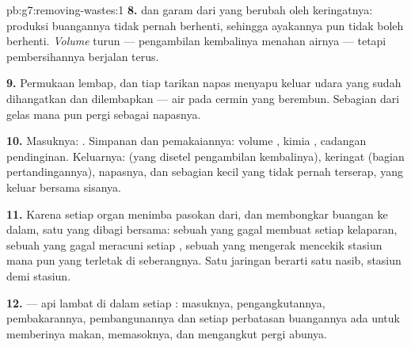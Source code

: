 \begin{solution}{pb:g7:removing-wastes:1}
\textbf{8.}  dan garam dari  yang berubah oleh keringatnya:
produksi buangannya tidak pernah berhenti, sehingga ayakannya pun
tidak boleh berhenti. \emph{Volume}  turun --- pengambilan
kembalinya menahan airnya --- tetapi pembersihannya berjalan terus.

\textbf{9.} Permukaan  lembap, dan tiap tarikan napas
menyapu keluar udara yang sudah dihangatkan dan dilembapkan --- air
pada cermin yang berembun. Sebagian dari gelas mana pun pergi sebagai
 napasnya.

\textbf{10.} Masuknya: . Simpanan dan pemakaiannya: volume
, kimia , cadangan pendinginan. Keluarnya:  (yang disetel
pengambilan kembalinya), keringat (bagian pertandingannya), 
napasnya, dan sebagian kecil yang tidak pernah terserap, yang keluar
bersama sisanya.

\textbf{11.} Karena setiap organ menimba pasokan dari, dan membongkar
buangan ke dalam, satu  yang dibagi bersama: sebuah 
yang gagal membuat setiap  kelaparan, sebuah  yang gagal
meracuni setiap , sebuah  yang mengerak mencekik stasiun mana
pun yang terletak di seberangnya. Satu jaringan berarti satu nasib,
stasiun demi stasiun.

\textbf{12.}  --- api lambat di dalam setiap : masuknya,
pengangkutannya, pembakarannya, pembangunannya dan setiap perbatasan
buangannya ada untuk memberinya makan, memasoknya, dan mengangkut
pergi abunya.
\end{solution}
